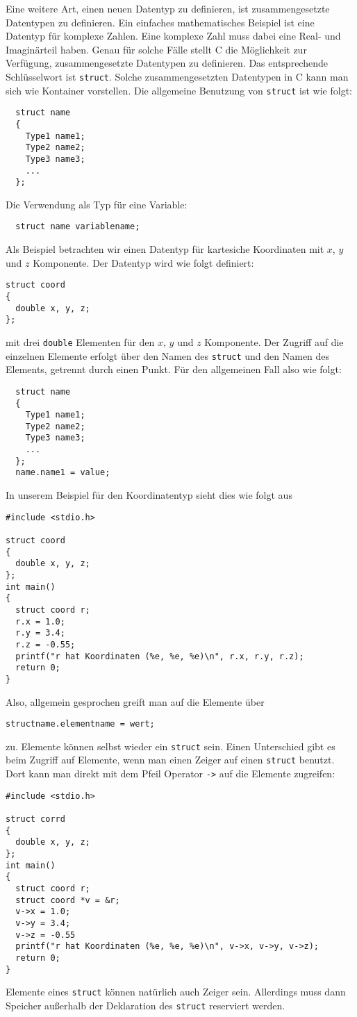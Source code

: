 Eine weitere Art, einen neuen Datentyp zu definieren, ist zusammengesetzte Datentypen zu definieren.
Ein einfaches mathematisches Beispiel ist eine Datentyp für komplexe Zahlen.
Eine komplexe Zahl muss dabei eine Real- und Imaginärteil haben.
Genau für solche Fälle stellt C die Möglichkeit zur Verfügung, zusammengesetzte Datentypen zu definieren.
Das entsprechende Schlüsselwort ist \verb|struct|.
Solche zusammengesetzten Datentypen in C kann man sich wie Kontainer vorstellen.
Die allgemeine Benutzung von \verb|struct| ist wie folgt:
\begin{lstlisting}
  struct name
  {
    Type1 name1;
    Type2 name2;
    Type3 name3;
    ...
  };
\end{lstlisting}
Die Verwendung als Typ für eine Variable:
\begin{lstlisting}
  struct name variablename;
\end{lstlisting}
Als Beispiel betrachten wir einen Datentyp für kartesiche Koordinaten mit $x$, $y$ und $z$ Komponente.
Der Datentyp wird wie folgt definiert:
\begin{lstlisting}
struct coord
{
  double x, y, z;
};
\end{lstlisting}
mit drei \verb|double| Elementen für den $x$, $y$ und $z$ Komponente.
Der Zugriff auf die einzelnen Elemente erfolgt über den Namen des \verb|struct| und den Namen des Elements, getrennt durch einen Punkt.
Für den allgemeinen Fall also wie folgt:
\begin{lstlisting}
  struct name
  {
    Type1 name1;
    Type2 name2;
    Type3 name3;
    ...
  };
  name.name1 = value;
\end{lstlisting}
In unserem Beispiel für den Koordinatentyp sieht dies wie folgt aus
\begin{lstlisting}
#include <stdio.h>

struct coord
{
  double x, y, z;
};
int main()
{
  struct coord r;
  r.x = 1.0;
  r.y = 3.4;
  r.z = -0.55;
  printf("r hat Koordinaten (%e, %e, %e)\n", r.x, r.y, r.z);
  return 0;
}
\end{lstlisting}
Also, allgemein gesprochen greift man auf die Elemente über 
\begin{lstlisting}
structname.elementname = wert;
\end{lstlisting}
zu.
Elemente können selbst wieder ein \verb|struct| sein.
Einen Unterschied gibt es beim Zugriff auf Elemente, wenn man einen Zeiger auf einen \verb|struct| benutzt.
Dort kann man direkt mit dem Pfeil Operator \verb|->| auf die Elemente zugreifen:
\begin{lstlisting}
#include <stdio.h>

struct corrd
{
  double x, y, z;
};
int main()
{
  struct coord r;
  struct coord *v = &r;
  v->x = 1.0;
  v->y = 3.4;
  v->z = -0.55
  printf("r hat Koordinaten (%e, %e, %e)\n", v->x, v->y, v->z);
  return 0;
}
\end{lstlisting}
Elemente eines \verb|struct| können natürlich auch Zeiger sein.
Allerdings muss dann Speicher außerhalb der Deklaration des \texttt{struct} reserviert werden.

